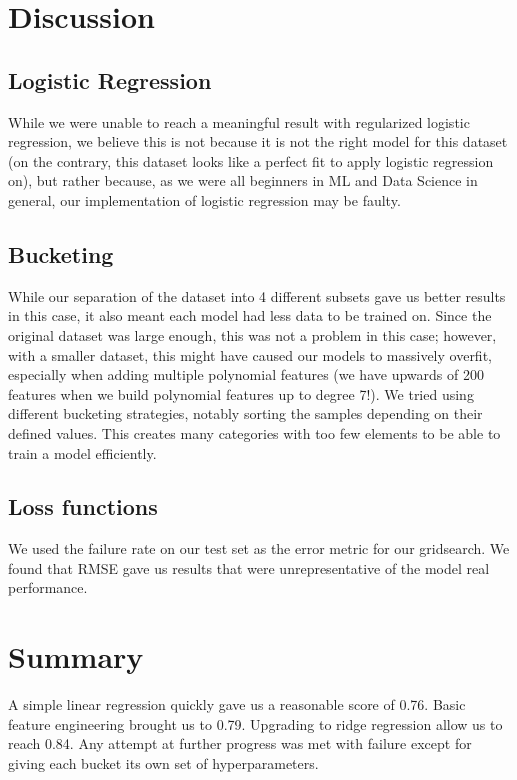 \documentclass[11pt,conference,compsocconf]{IEEEtran}
\begin{document}
\section{Discussion}
\subsection{Logistic Regression}
While we were unable to reach a meaningful result with regularized logistic regression, we believe this is not because it is not the right model for this dataset (on the contrary, this dataset looks like a perfect fit to apply logistic regression on), but rather because, as we were all beginners in ML and Data Science in general, our implementation of logistic regression may be faulty.

\subsection{Bucketing}
While our separation of the dataset into 4 different subsets gave us better results in this case, it also meant each model had less data to be trained on. Since the original dataset was large enough, this was not a problem in this case; however, with a smaller dataset, this might have caused our models to massively overfit, especially when adding multiple polynomial features (we have upwards of 200 features when we build polynomial features up to degree 7!).
We tried using different bucketing strategies, notably sorting the samples depending on their defined values. This creates many categories with too few elements to be able to train a model efficiently. 

\subsection{Loss functions}
We used the failure rate on our test set as the error metric for our gridsearch. 
We found that RMSE gave us results that were unrepresentative of the model real performance. 

\section{Summary}
A simple linear regression quickly gave us a reasonable score of 0.76. Basic feature engineering brought us to 0.79. Upgrading to ridge regression allow us to reach 0.84.
Any attempt at further progress was met with failure except for giving each bucket its own set of hyperparameters. 
\end{document}
